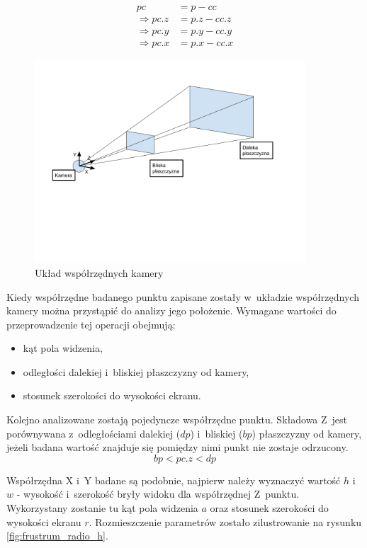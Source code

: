\documentclass[a4paper,twoside,12pt]{book}
\begin{document}
\begin{align}
pc &= p - cc \\
\Rightarrow pc.z &= p.z - cc.z \\
\Rightarrow pc.y &= p.y - cc.y \\
\Rightarrow pc.x &= p.x - cc.x
\end{align}

\begin{figure}[H]
    \centering
    \includegraphics[width=0.9\textwidth]{res/frustrum_radio_ref.png}
    \caption{Układ współrzędnych kamery}
    \label{fig:frustrum_radio_ref}
\end{figure}

Kiedy współrzędne badanego punktu zapisane zostały w~układzie współrzędnych kamery można przystąpić do analizy jego położenie. Wymagane wartości do przeprowadzenie tej operacji obejmują:
\begin{itemize}
    \item kąt pola widzenia,
    \item odległości dalekiej i~bliskiej płaszczyzny od kamery,
    \item stosunek szerokości do wysokości ekranu.
\end{itemize}
Kolejno analizowane zostają pojedyncze współrzędne punktu. Składowa Z~jest porównywana z~odległościami dalekiej ($dp$) i~bliskiej ($bp$) płaszczyzny od kamery, jeżeli badana wartość znajduje się pomiędzy nimi punkt nie zostaje odrzucony.
\begin{equation}
    bp < pc.z < dp
\end{equation}

Współrzędna X i~Y badane są podobnie, najpierw należy wyznaczyć wartość $h$ i~$w$ - wysokość i~szerokość bryły widoku dla współrzędnej Z~punktu. Wykorzystany zostanie tu kąt pola widzenia $a$ oraz stosunek szerokości do wysokości ekranu $r$. Rozmieszczenie parametrów zostało zilustrowanie na rysunku \ref{fig:frustrum_radio_h}.
\end{document}
